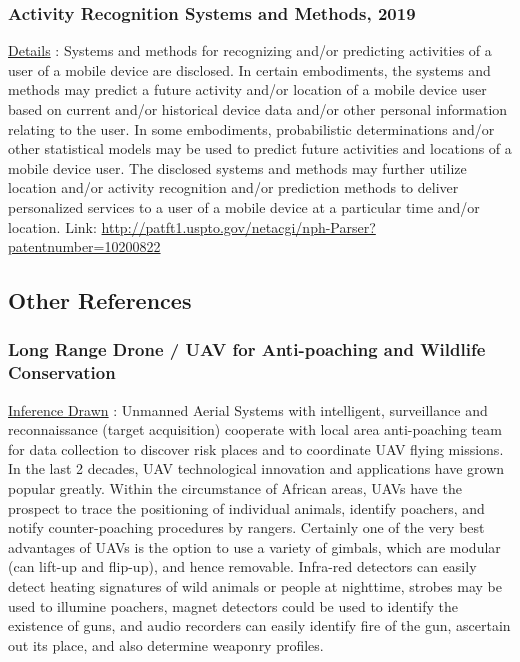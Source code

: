 \documentclass[12pt]{extarticle}
\begin{document}
\subsubsection{Activity Recognition Systems and Methods, 2019}
\underline{Details} :
Systems and methods for recognizing and/or predicting activities of a user of a mobile device are disclosed. In certain embodiments, the systems and methods may predict a future activity and/or location of a mobile device user based on current and/or historical device data and/or other personal information relating to the user. In some embodiments, probabilistic determinations and/or other statistical models may be used to predict future activities and locations of a mobile device user. The disclosed systems and methods may further utilize location and/or activity recognition and/or prediction methods to deliver personalized services to a user of a mobile device at a particular time and/or location.
\newline
Link: \underline{http://patft1.uspto.gov/netacgi/nph-Parser?patentnumber=10200822}

\subsection{Other References}

\subsubsection{Long Range Drone / UAV for Anti-poaching and Wildlife Conservation}
\underline{Inference Drawn} :
Unmanned Aerial Systems with intelligent, surveillance and reconnaissance (target acquisition) cooperate with local area anti-poaching team for data collection to discover risk places and to coordinate UAV flying missions. In the last 2 decades, UAV technological innovation and applications have grown popular greatly. Within the circumstance of African areas, UAVs have the prospect to trace the positioning of individual animals, identify poachers, and notify counter-poaching procedures by rangers. Certainly one of the very best advantages of UAVs is the option to use a variety of gimbals, which are modular (can lift-up and flip-up), and hence removable. Infra-red detectors can easily detect heating signatures of wild animals or people at nighttime, strobes may be used to illumine poachers, magnet detectors could be used to identify the existence of guns, and audio recorders can easily identify fire of the gun, ascertain out its place, and also determine weaponry profiles.
\end{document}
